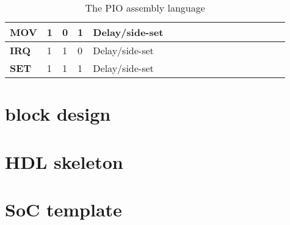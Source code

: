 \begin{table}[]
\begin{tabular}{|l|l|l|l|lllll|l|l|l|l|l|l|l|l|}
        \textbf{MOV}  & 1  & 0  & 1  & Delay/side-set          &                         &                         &                        &           &           &           &           &           &           &           &           &           \\ \hline
        \textbf{IRQ}  & 1  & 1  & 0  & Delay/side-set          &                         &                         &                        &           &           &           &           &           &           &           &           &           \\ \hline
        \textbf{SET}  & 1  & 1  & 1  & Delay/side-set          &                         &                         &                        &           &           &           &           &           &           &           &           &           \\ \hline
    \end{tabular}
    \caption{The PIO assembly language}
    \label{tab:pioasm}
\end{table}

\section{block design}

\section{HDL skeleton}

\section{SoC template}